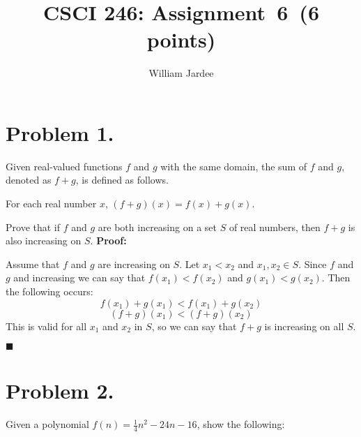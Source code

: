 \documentclass[11pt]{article}
\begin{document}
\date{}

\title{CSCI 246: Assignment~6~(6 points)}

\author{William Jardee}

\maketitle

 
\section*{Problem 1.}

\noindent
Given real-valued functions $f$ and $g$ with the same domain, the sum of $f$ and $g$, denoted as $f+g$, is defined as follows.
\newline

For each real number $x$, $(f+g)(x)=f(x)+g(x)$.

\noindent
Prove that if $f$ and $g$ are both increasing on a set $S$ of real numbers,
then $f+g$ is also increasing on $S$.
\newline
\newline
\noindent
{\bf Proof:}~~
\newline

Assume that $f$ and $g$ are increasing on $S$. Let $x_1 < x_2$ and $x_1, x_2 \in S$. Since $f$ and $g$ and increasing we can say that $f(x_1)<f(x_2)$ and $g(x_1)<g(x_2)$. Then the following occurs:
\[f(x_1)+g(x_1) < f(x_1) + g(x_2)\]
\[(f+g)(x_1) < (f+g)(x_2)\]
This is valid for all $x_1$ and $x_2$ in $S$, so we can say that $f+g$ is increasing on all $S$.
\begin{flushright}$\blacksquare$\end{flushright}
\newpage

\section*{Problem 2.}

\noindent
Given a polynomial $f(n)=\frac{1}{4}n^2-24n-16$, show the following:
\newline
\end{document}
